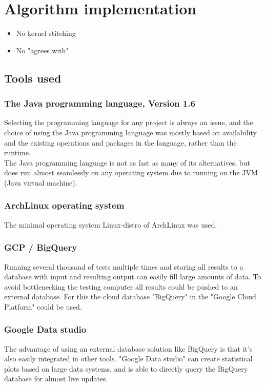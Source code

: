 \documentclass[a4paper]{article}
\begin{document}
%
%
\newpage

\section{Algorithm implementation}
\begin{itemize}
    \item No kernel stitching
    \item No "agrees with"
\end{itemize}
\subsection{Tools used}
\subsubsection{The Java programming language, Version 1.6}
Selecting the programming language for any project is always an issue, and the choice of using
the Java programming language was mostly based on availability and the existing operations
and packages in the language, rather than the runtime.
\\
The Java programming language is not as fast as many of its alternatives, but does run almost
seamlessly on any operating system due to running on the JVM (Java virtual machine).

\subsubsection{ArchLinux operating system}
The minimal operating system Linux-distro of ArchLinux was used.

\subsubsection{GCP / BigQuery}
Running several thousand of tests multiple times and storing all results to a database with
input and resulting output can easily fill large amounts of data. To avoid bottlenecking the
testing computer all results could be pushed to an external database. For this the cloud database
"BigQuery" in the "Google Cloud Platform" could be used.

\subsubsection{Google Data studio}
The advantage of using an external database solution like BigQuery is that it's also easily
integrated in other tools. "Google Data studio" can create statistical plots based on large
data systems, and is able to directly query the BigQuery database for almost live updates.
\end{document}
